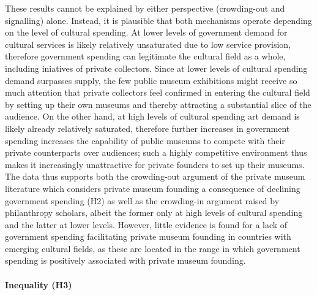 \documentclass[11pt, authoryear]{elsarticle}
\begin{document}
These results cannot be explained by either perspective (crowding-out and signalling) alone. 
Instead, it is plausible that both mechanisms operate depending on the level of cultural spending.
At lower levels of government demand for cultural services is likely relatively unsaturated due to low service provision, therefore government spending can legitimate the cultural field as a whole, including iniatives of private collectors.
Since at lower levels of cultural spending demand surpasses supply, the few public museum exhibitions might receive so much attention that private collectors feel confirmed in entering the cultural field by setting up their own museums and thereby attracting a substantial slice of the audience.
On the other hand, at high levels of cultural spending art demand is likely already relatively saturated, therefore further increases in government spending increases the capability of public museums to compete with their private counterparts over audiences; such a highly competitive environment thus makes it increasingly unattractive for private founders to set up their museums. 
The data thus supports both the crowding-out argument of the private museum literature which considers private museum founding a consequence of declining government spending (H2) as well as the crowding-in argument raised by philanthropy scholars, albeit the former only at high levels of cultural spending and the latter at lower levels.
However, little evidence is found for a lack of government spending facilitating private museum founding in countries with emerging cultural fields, as these are located in the range in which government spending is positively associated with private museum founding. 

\paragraph*{Inequality (H3)}
\end{document}

